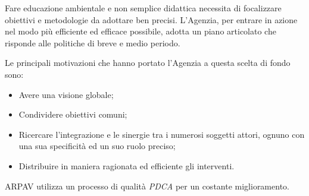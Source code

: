 Fare educazione ambientale e non semplice didattica necessita di focalizzare obiettivi e metodologie da adottare ben precisi. L'Agenzia, per entrare in azione nel modo più efficiente ed efficace possibile, adotta un piano articolato che risponde alle politiche di breve e medio periodo.

Le principali motivazioni che hanno portato l'Agenzia a questa scelta di fondo sono:
\begin{itemize}
\item Avere una visione globale;
\item Condividere obiettivi comuni;
\item Ricercare l'integrazione e le sinergie tra i numerosi soggetti attori, ognuno con una sua specificità ed un suo ruolo preciso;
\item Distribuire in maniera ragionata ed efficiente gli interventi.
\end{itemize}

ARPAV utilizza un processo di qualità \textit{PDCA} per un costante miglioramento.

